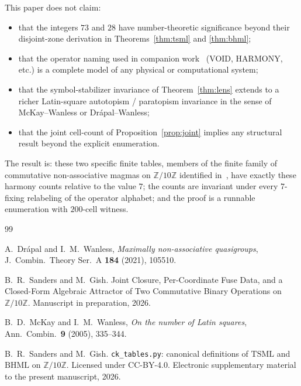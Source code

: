 \documentclass[11pt,reqno]{amsart}
\theoremstyle{plain}
\theoremstyle{definition}
\theoremstyle{remark}
\newcommand{\Z}{\mathbb{Z}}
\newcommand{\Zten}{\Z/10\Z}
\newcommand{\TSML}{\mathrm{TSML}}
\newcommand{\BHML}{\mathrm{BHML}}
\begin{document}
This paper does not claim:
\begin{itemize}\setlength\itemsep{1pt}
\item that the integers $73$ and $28$ have number-theoretic
significance beyond their disjoint-zone derivation in
Theorems~\ref{thm:tsml} and \ref{thm:bhml};
\item that the operator naming used in companion
work~\cite{FourCore} (VOID, HARMONY, etc.) is a complete model of
any physical or computational system;
\item that the symbol-stabilizer invariance of
Theorem~\ref{thm:lens} extends to a richer Latin-square
autotopism / paratopism invariance in the sense of
McKay--Wanless or Dr\'apal--Wanless;
\item that the joint cell-count of Proposition~\ref{prop:joint}
implies any structural result beyond the explicit enumeration.
\end{itemize}
The result is: these two specific finite tables, members of the
finite family of commutative non-associative magmas on $\Zten$
identified in~\cite{FourCore}, have exactly these harmony counts
relative to the value $7$; the counts are invariant under every
$7$-fixing relabeling of the operator alphabet; and the proof is
a runnable enumeration with $200$-cell witness.

\begin{thebibliography}{99}

A.~Dr\'apal and I.~M.~Wanless,
\emph{Maximally non-associative quasigroups},
J.\ Combin.\ Theory Ser.\ A \textbf{184} (2021), 105510.

B.~R.~Sanders and M.~Gish.
\newblock Joint Closure, Per-Coordinate Fuse Data, and a
Closed-Form Algebraic Attractor of Two Commutative Binary
Operations on $\mathbb{Z}/10\mathbb{Z}$.
\newblock Manuscript in preparation, 2026.

B.~D.~McKay and I.~M.~Wanless,
\emph{On the number of Latin squares},
Ann.\ Combin.\ \textbf{9} (2005), 335--344.

B.~R.~Sanders and M.~Gish.
\newblock \texttt{ck\_tables.py}: canonical definitions of
$\TSML$ and $\BHML$ on $\Zten$. Licensed under CC-BY-4.0.
\newblock Electronic supplementary material to the present
manuscript, 2026.

\end{thebibliography}
\end{document}
